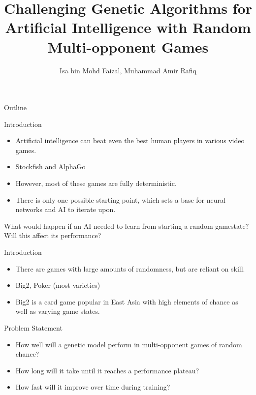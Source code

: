 \documentclass{beamer}
\title{Challenging Genetic Algorithms for Artificial Intelligence with Random Multi-opponent Games}
\author{Isa bin Mohd Faizal, Muhammad Amir Rafiq}
\institute{Universiti Kebangsaan Malaysia}
\begin{document}
	
	
\begin{frame}[plain]
    \maketitle
\end{frame}

\begin{frame}{Outline}

	\tableofcontents
	
\end{frame}

\begin{frame}{Introduction}
	
	\begin{itemize}
		\item  Artificial intelligence can beat even the best human players in various video games.
		\item Stockfish and AlphaGo
		\item However, most of these games are fully deterministic.
		\item There is only one possible starting point, which sets a base for neural networks and AI to iterate upon.
	\end{itemize}
	What would happen if an AI needed to learn from starting a random gamestate? Will this affect its performance?
	
\end{frame}

\begin{frame}{Introduction}
	
	\begin{itemize}
		\item  There are games with large amounts of randomness, but are reliant on skill.
		\item Big2, Poker (most varieties)
		\item Big2 is a card game popular in East Asia with high elements of chance as well as varying game states. 
		
	\end{itemize}
	
	
\end{frame}

\begin{frame}{Problem Statement}

	\begin{itemize}
		
		\item How well will a genetic model perform in multi-opponent games of random chance?
		\item How long will it take until it reaches a performance plateau?
		\item How fast will it improve over time during training?
		
		
	\end{itemize}

\end{frame}
\end{document}
